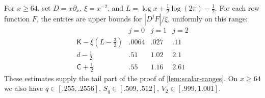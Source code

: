 \begin{lemma}\label{lem:scalar-tail}
For $x\ge64$, set $D=x\partial_x$, $\xi=x^{-2}$, and $L=\log x+\frac12\log(2\pi)-\frac12$. For each row function $F$, the entries are upper bounds for $|D^jF|/\xi$, uniformly on this range:
\[
\begin{array}{c|ccc}
 &j=0&j=1&j=2\\\hline
 \mathsf K-\xi(L-\tfrac32)&.0064&.027&.11\\
 d-\tfrac12&.51&1.02&2.1\\
 \mathsf C+\tfrac12&.55&1.16&2.61
\end{array}
\]
These estimates supply the tail part of the proof of \cref{lem:scalar-ranges}. On $x\ge64$ we also have $q\in[.255,.2556]$, $S_q\in[.509,.512]$, $V_2\in[.999,1.001]$.
\end{lemma}


